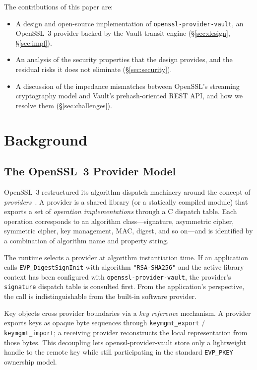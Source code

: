 \documentclass[sigconf,10pt]{acmart}
\begin{document}
The contributions of this paper are:
\begin{itemize}
  \item A design and open-source implementation of \texttt{openssl-provider-vault},
        an OpenSSL~3 provider backed by the Vault transit engine
        (\S\ref{sec:design}, \S\ref{sec:impl}).
  \item An analysis of the security properties that the design provides, and
        the residual risks it does not eliminate (\S\ref{sec:security}).
  \item A discussion of the impedance mismatches between OpenSSL's streaming
        cryptography model and Vault's prehash-oriented REST API, and how we
        resolve them (\S\ref{sec:challenges}).
\end{itemize}

\section{Background}
\label{sec:background}

\subsection{The OpenSSL~3 Provider Model}

OpenSSL~3 restructured its algorithm dispatch machinery around the concept of
\emph{providers}~\cite{openssl3-providers}.  A provider is a shared library
(or a statically compiled module) that exports a set of \emph{operation
implementations} through a C dispatch table.  Each operation corresponds to
an algorithm class---signature, asymmetric cipher, symmetric cipher, key
management, MAC, digest, and so on---and is identified by a combination of
algorithm name and property string.

The runtime selects a provider at algorithm instantiation time.  If an
application calls \texttt{EVP\_DigestSignInit} with algorithm
\texttt{"RSA-SHA256"} and the active library context has been configured with
\texttt{openssl-provider-vault}, the provider's \texttt{signature} dispatch table is
consulted first.  From the application's perspective, the call is
indistinguishable from the built-in software provider.

Key objects cross provider boundaries via a \emph{key reference} mechanism.
A provider exports keys as opaque byte sequences through
\texttt{keymgmt\_export} / \texttt{keymgmt\_import}; a receiving provider
reconstructs the local representation from those bytes.  This decoupling
lets openssl-provider-vault store only a lightweight handle to the remote key while
still participating in the standard \texttt{EVP\_PKEY} ownership model.
\end{document}
